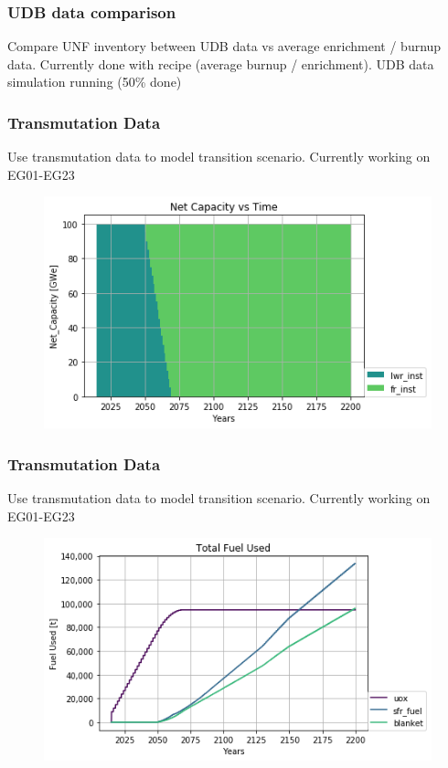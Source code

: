\documentclass[9pt]{beamer}
\begin{document}
\begin{frame}
    \frametitle{UDB data comparison}
    Compare UNF inventory between UDB data vs average enrichment / burnup data.
    Currently done with recipe (average burnup / enrichment). UDB data simulation
    running (50\% done)
\end{frame}

\begin{frame}
    \frametitle{Transmutation Data}
    Use transmutation data to model transition scenario. Currently working on EG01-EG23
        \begin{figure}[htbp!]
        \begin{center}
                \includegraphics[width=.7\textwidth]{./images/transition/power_plot.png}
        \end{center}
    \end{figure}
\end{frame}

\begin{frame}
    \frametitle{Transmutation Data}
    Use transmutation data to model transition scenario. Currently working on EG01-EG23
        \begin{figure}[htbp!]
        \begin{center}
                \includegraphics[width=.7\textwidth]{./images/transition/blanket_fuel.png}
        \end{center}
    \end{figure}
\end{frame}
\end{document}
